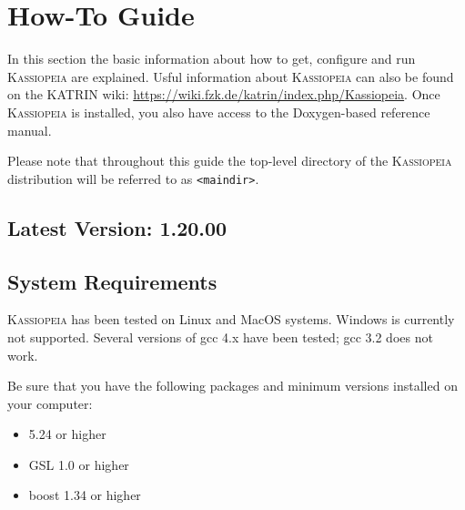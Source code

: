 \chapter{How-To Guide}\label{ch:howto}

In this section the basic information about how to get, configure and run \textsc{Kassiopeia} are explained.
Usful information about \textsc{Kassiopeia} can also be found on the KATRIN wiki: \url{https://wiki.fzk.de/katrin/index.php/Kassiopeia}. Once \textsc{Kassiopeia} is installed, you also have access to the Doxygen-based reference manual.

Please note that throughout this guide the top-level directory of the \textsc{Kassiopeia} distribution will be referred to as \texttt{<maindir>}.


\section{Latest Version: 1.20.00}


\section{System Requirements}
\textsc{Kassiopeia} has been tested on Linux and MacOS systems.  Windows is currently not supported.  Several versions of gcc 4.x have been tested; gcc 3.2 does not work.

Be sure that you have the following packages and minimum versions installed on your computer:
\begin{itemize}
	\item \cernroot{} 5.24 or higher
	\item GSL 1.0 or higher
	\item boost 1.34 or higher
\end{itemize}


